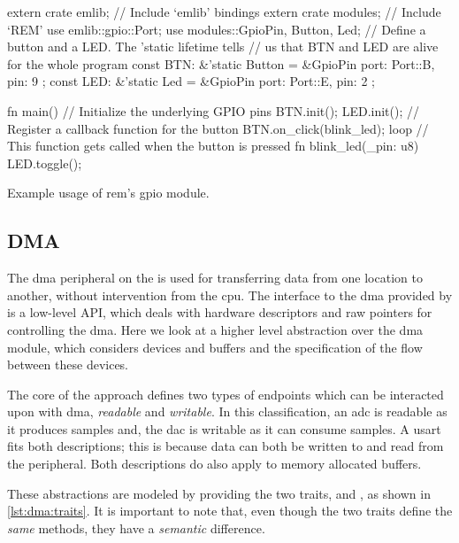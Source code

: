 \begin{listing}[H]
  \begin{rustcode}
extern crate emlib;    // Include `emlib' bindings
extern crate modules;  // Include `REM'
use emlib::gpio::Port;
use modules::{GpioPin, Button, Led};
// Define a button and a LED. The 'static lifetime tells
// us that BTN and LED are alive for the whole program
const BTN: &'static Button = &GpioPin { port: Port::B, pin: 9 };
const LED: &'static Led    = &GpioPin { port: Port::E, pin: 2 };

fn main() {
  // Initialize the underlying GPIO pins
  BTN.init();
  LED.init();
  // Register a callback function for the button
  BTN.on_click(blink_led);
  loop {}
}
// This function gets called when the button is pressed
fn blink_led(_pin: u8) {
  LED.toggle();
}
  \end{rustcode}
  \caption{Example usage of \gls{rem}'s \gls{gpio} module.}
  \label{lst:gpio_abstraction}
\end{listing}

\subsection{DMA}

The \gls{dma} peripheral on the {\gecko} is used for transferring data from one location to another, without intervention from the \gls{cpu}.
The interface to the \gls{dma} provided by {\emlib} is a low-level API, which deals with hardware descriptors and raw pointers for controlling the \gls{dma}.
Here we look at a higher level abstraction over the \gls{dma} module, which considers devices and buffers and the specification of the flow between these devices.

The core of the approach defines two types of endpoints which can be interacted upon with \gls{dma}, \emph{readable} and \emph{writable}.
In this classification, an \gls{adc} is readable as it produces samples and, the \gls{dac} is writable as it can consume samples.
A \gls{usart} fits both descriptions; this is because data can both be written to and read from the peripheral.
Both descriptions do also apply to memory allocated buffers.

These abstractions are modeled by providing the two traits,  and , as shown in \autoref{lst:dma:traits}.
It is important to note that, even though the two traits define the \emph{same} methods, they have a \emph{semantic} difference.

